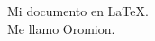 \documentclass[12pt]{article}
\begin{document}
Mi documento en \LaTeX{}.\\
Me llamo Oromion.
\end{document}
